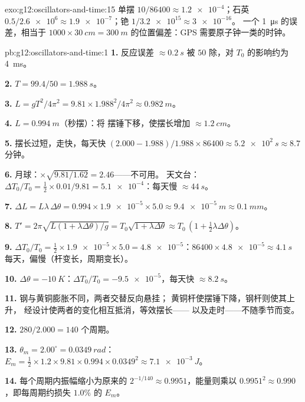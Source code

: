 \begin{solution}{exo:g12:oscillators-and-time:15}
单摆 $10/86400 \approx \num{1.2e-4}$；石英 $0.5/\num{2.6e6}
\approx \num{1.9e-7}$；铯 $1/\num{3.2e15} \approx \num{3e-16}$。
一个 \qty{1}{\micro s} 的误差，相当于 $\num{1000} \times \qty{30}{cm} =
\qty{300}{m}$ 的位置偏差：GPS 需要原子钟一类的时钟。
\end{solution}

\begin{solution}{pb:g12:oscillators-and-time:1}
\textbf{1.} 反应误差 $\approx \qty{0.2}{s}$ 被
$50$ 除，对 $T_0$ 的影响约为 \qty{4}{ms}。

\textbf{2.} $T = 99.4/50 = \qty{1.988}{s}$。

\textbf{3.} $L = gT^2/4\pi^2 = 9.81 \times 1.988^2/4\pi^2 \approx
\qty{0.982}{m}$。

\textbf{4.} $L = \qty{0.994}{m}$（秒摆）：将
摆锤下移，使摆长增加 $\approx \qty{1.2}{cm}$。

\textbf{5.} 摆长过短，走快，每天快 $(2.000 -
1.988)/1.988 \times 86400 \approx \qty{5.2e2}{s} \approx 8.7$
分钟。

\textbf{6.} 月球：$\times\sqrt{9.81/1.62} = 2.46$——不可用。
天文台：$\Delta T_0/T_0 = \tfrac12 \times 0.01/9.81 =
\num{5.1e-4}$：每天慢 $\approx \qty{44}{s}$。

\textbf{7.} $\Delta L = L\lambda\,\Delta\theta = 0.994 \times
\num{1.9e-5} \times 5.0 \approx \qty{9.4e-5}{m} \approx
\qty{0.1}{mm}$。

\textbf{8.} $T' = 2\pi\sqrt{L(1 + \lambda\Delta\theta)/g} =
T_0\sqrt{1 + \lambda\Delta\theta} \approx T_0\,(1 + \tfrac12
\lambda\Delta\theta)$。

\textbf{9.} $\Delta T_0/T_0 = \tfrac12 \times \num{1.9e-5} \times
5.0 = \num{4.8e-5}$：$86400 \times \num{4.8e-5} \approx
\qty{4.1}{s}$ 每天，偏慢（杆变长，周期变长）。

\textbf{10.} $\Delta\theta = \qty{-10}{K}$：$\Delta T_0/T_0 =
\num{-9.5e-5}$，每天快 $\approx \qty{8.2}{s}$。

\textbf{11.} 钢与黄铜膨胀不同，两者交替反向悬挂；
黄铜杆使摆锤下降，钢杆则使其上升，
经设计使两者的变化相互抵消，等效摆长——
以及走时——不随季节而变。

\textbf{12.} $280/2.000 = 140$ 个周期。

\textbf{13.} $\theta_m = 2.00^\circ = \qty{0.0349}{rad}$：$E_m =
\tfrac12 \times 1.2 \times 9.81 \times 0.994 \times 0.0349^2 \approx
\qty{7.1e-3}{J}$。

\textbf{14.} 每个周期内振幅缩小为原来的 $2^{-1/140} \approx
0.9951$，能量则乘以 $0.9951^2 \approx 0.990$，即每周期约损失 $1.0\%$
的 $E_m$。


\end{solution}
